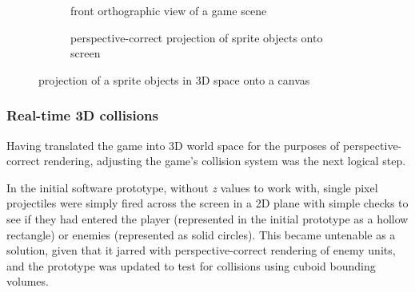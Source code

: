 \documentclass{article}
\begin{document}
\begin{figure}[h]
\begin{subfigure}{.3\textwidth}
\begin{tikzpicture}
   \end{tikzpicture}
   \caption{front orthographic view of a game scene}
   \label{fig:rotfig1}
\end{subfigure}\hfill
\begin{subfigure}{.3\textwidth}
   \centering
   \caption{perspective-correct projection of sprite objects onto screen}
   \label{fig:rotfig2}
\end{subfigure}\hfill
\caption{projection of a sprite objects in 3D space onto a canvas}
\label{fig:projection}
\end{figure}

\subsubsection*{Real-time 3D collisions}


Having translated the game into 3D world space for the purposes of perspective-correct rendering, adjusting
the game's collision system was the next logical step.

In the initial software prototype, without \textit{z} values to work with, single pixel projectiles were simply
fired across the screen in a 2D plane with simple checks to see if they had entered the player (represented in
the initial prototype as a hollow rectangle) or enemies (represented as solid circles). This became untenable
as a solution, given that it jarred with perspective-correct rendering of enemy units, and the prototype was
updated to test for collisions using cuboid bounding volumes.
\end{document}

